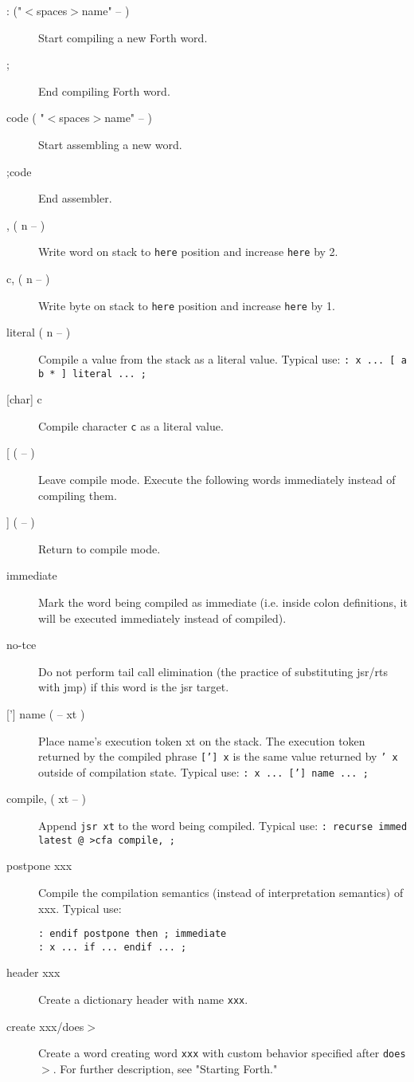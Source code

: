 \begin{description}
\item[: ("$<$spaces$>$name" -- )] Start compiling a new Forth word.
\item[;] End compiling Forth word.
\item[code ( "$<$spaces$>$name" -- )] Start assembling a new word.
\item[;code] End assembler.
\item[, ( n -- )] Write word on stack to \texttt{here} position and increase \texttt{here} by 2.
\item[c, ( n -- )] Write byte on stack to \texttt{here} position and increase \texttt{here} by 1.
\item[literal ( n -- )] Compile a value from the stack as a literal value. Typical use: \texttt{: x ... [ a b * ] literal ... ;}
\item[[char{]} c] Compile character \texttt{c} as a literal value.
\item[[ ( -- )] Leave compile mode. Execute the following words immediately instead of compiling them.
\item[{]} ( -- )] Return to compile mode.
\item[immediate] Mark the word being compiled as immediate (i.e. inside colon definitions, it will be executed immediately instead of compiled).
\item[no-tce] Do not perform tail call elimination (the practice of substituting jsr/rts with jmp) if this word is the jsr target.
\item[{[']} name ( -- xt )] Place name's execution token xt on the stack. The execution token returned by the compiled phrase \texttt{['] x} is the same value returned by \texttt{' x} outside of compilation state. Typical use: \texttt{: x ... {[}'{]} name ... ;}
\item[compile, ( xt -- )] Append \texttt{jsr xt} to the word being compiled. Typical use: \texttt{: recurse immed latest @ >cfa compile, ;}
\item[postpone xxx] Compile the compilation semantics (instead of interpretation semantics) of xxx. Typical use: 
\begin{verbatim}
: endif postpone then ; immediate
: x ... if ... endif ... ;
\end{verbatim}
\item[header xxx] Create a dictionary header with name \texttt{xxx}. 
\item[create xxx/does$>$] Create a word creating word \texttt{xxx} with custom behavior
specified after \texttt{does$>$}. For further description, see "Starting Forth."

\end{description}

